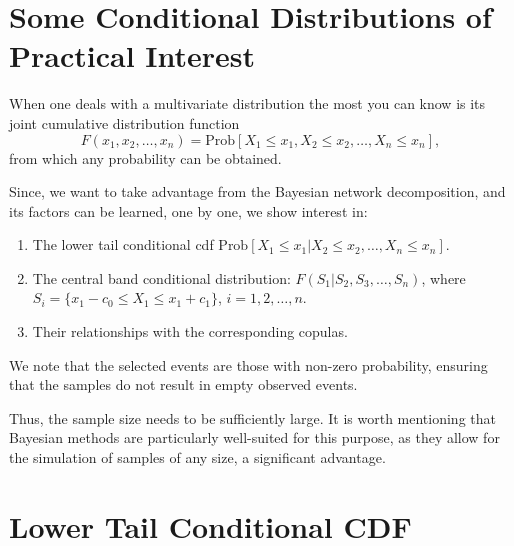 \section{Some Conditional Distributions of Practical Interest}

When one deals with a multivariate distribution the most you can know is its joint cumulative distribution function
\begin{equation}
F(x_1, x_2,\ldots, x_n) = \text{Prob}[X_1 \leq x_1, X_2 \leq x_2,\ldots, X_n \leq x_n],
\label{eq:jointcdf}
\end{equation}
from which any probability can be obtained.

Since, we want to take advantage from the Bayesian network decomposition, and its factors can be learned, one by one, we show interest in:
\begin{enumerate}
\item The lower tail conditional cdf $\text{Prob}[X_1 \leq x_1|X_2 \leq x_2,\ldots,X_n \leq x_n]$.
\item The central band conditional distribution: $F(S_1|S_2,S_3,\ldots,S_n)$, where $S_i = \{x_1-c_0 \leq X_1 \leq x_1+c_1\}$, $i = 1,2,\ldots,n$.
\item Their relationships with the corresponding copulas.
\end{enumerate}

We note that the selected events are those with non-zero probability, ensuring that the samples do not result in empty observed events.

Thus, the sample size needs to be sufficiently large. It is worth mentioning that Bayesian methods are particularly well-suited for this purpose, as they allow for the simulation of samples of any size, a significant advantage.

\section{Lower Tail Conditional CDF}

